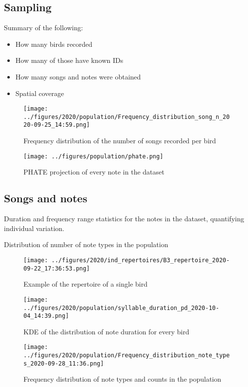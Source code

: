 \documentclass[]{report}
\providecommand{\tightlist}{%
  \setlength{\itemsep}{0pt}\setlength{\parskip}{0pt}}
\begin{document}
\hypertarget{sampling}{%
\subsection{Sampling}\label{sampling}}

Summary of the following:

\begin{itemize}
\tightlist
\item
  How many birds recorded
\item
  How many of those have known IDs
\item
  How many songs and notes were obtained
\item
  Spatial coverage
\end{itemize}

\begin{figure}
\centering
\texttt{[image: ../figures/2020/population/Frequency\_distribution\_song\_n\_2020-09-25\_14:59.png]}
\caption{Frequency distribution of the number of songs recorded per
bird}
\end{figure}

\begin{figure}
\centering
\texttt{[image: ../figures/population/phate.png]}
\caption{PHATE projection of every note in the dataset}
\end{figure}

\hypertarget{songs-and-notes}{%
\subsection{Songs and notes}\label{songs-and-notes}}

Duration and frequency range statistics for the notes in the dataset,
quantifying individual variation.

Distribution of number of note types in the population

\begin{figure}
\centering
\texttt{[image: ../figures/2020/ind\_repertoires/B3\_repertoire\_2020-09-22\_17:36:53.png]}
\caption{Example of the repertoire of a single bird}
\end{figure}

\begin{figure}
\centering
\texttt{[image: ../figures/2020/population/syllable\_duration\_pd\_2020-10-04\_14:39.png]}
\caption{KDE of the distribution of note duration for every bird}
\end{figure}

\begin{figure}
\centering
\texttt{[image: ../figures/2020/population/Frequency\_distribution\_note\_types\_2020-09-28\_11:36.png]}
\caption{Frequency distribution of note types and counts in the
population}
\end{figure}
\end{document}
